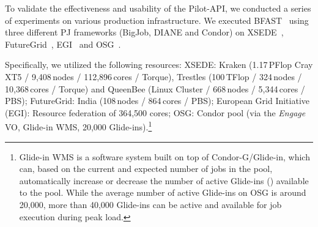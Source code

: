\documentclass[conference]{IEEEtran}
\begin{document}
To validate the effectiveness and usability of the Pilot-API, we
conducted a series of experiments on various production infrastructure. We
executed BFAST~\cite{bfast2009} using three different PJ frameworks (BigJob,
DIANE and Condor) on XSEDE~\cite{xsede}, FutureGrid~\cite{fg}, EGI~\cite{egi}
and OSG~\cite{1742-6596-78-1-012057}.

Specifically, we utilized the following resources: XSEDE: Kraken (1.17\,PFlop 
Cray XT5 / 9,408\,nodes / 112,896\,cores / Torque), Trestles 
(100\,TFlop / 324\,nodes / 10,368\,cores / Torque) and QueenBee
(Linux Cluster / 668\,nodes / 5,344\,cores / PBS); FutureGrid:
India (108\,nodes / 864\,cores / PBS); European Grid
Initiative (EGI): Resource federation of 364,500 cores;
OSG: Condor pool (via the \textit{Engage} VO, Glide-in WMS,
20,000 Glide-ins).\footnote{Glide-in WMS is a software system built on
top of Condor-G/Glide-in, which can, based on the current and expected
number of jobs in the pool,  automatically increase or decrease the
number of active Glide-ins (\pilots) available to the pool.  While the
average number of active Glide-ins on OSG is around 20,000, more than
40,000 Glide-ins can be active and available for job execution during
peak load.}

 


\end{document}
